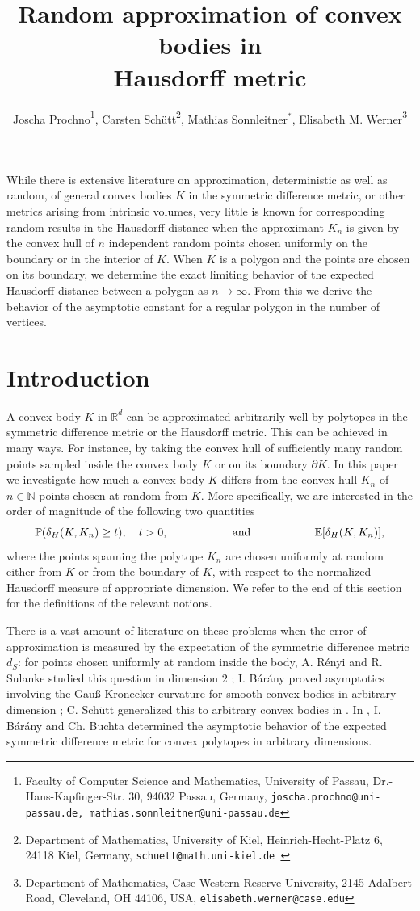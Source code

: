 \documentclass[a4paper,12pt]{article}
\title{Random approximation of convex bodies in\\ Hausdorff metric}
\author{Joscha Prochno\footnote{Faculty of Computer Science and Mathematics, University of Passau, Dr.-Hans-Kapfinger-Str. 30, 94032 Passau, Germany, {\tt joscha.prochno@uni-passau.de, mathias.sonnleitner@uni-passau.de}},
Carsten Sch\"utt\footnote{Department of Mathematics, University of Kiel, Heinrich-Hecht-Platz 6, 24118 Kiel, Germany, 
{\tt schuett@math.uni-kiel.de }},
Mathias Sonnleitner$^{*}$,
Elisabeth M. Werner\footnote{Department of Mathematics, Case Western Reserve University, 2145 Adalbert Road, Cleveland, OH 44106, USA,
{\tt elisabeth.werner@case.edu}}
}
\theoremstyle{definition}
\begin{document}
\maketitle

\abstract
While there is extensive literature on approximation, deterministic as well as random,  of general convex bodies $K$ in the symmetric difference metric, or other metrics arising from intrinsic volumes, very little is known for corresponding random results in the Hausdorff distance when the approximant $K_n$ is given by the convex hull of $n$ independent random points chosen uniformly on the boundary or in the interior of $K$. When $K$ is a polygon and the points are chosen on its boundary, we determine the exact limiting behavior of the expected Hausdorff distance between a polygon as $n\to\infty$. From this we derive the behavior of the asymptotic constant for a regular polygon in the number of vertices.



\section{Introduction}

A convex body $K$ in $\mathbb R^{d}$ can be approximated arbitrarily well by polytopes in  the symmetric difference metric or the Hausdorff metric. This can be achieved in many ways. For instance,
 by taking  the convex hull of sufficiently many random points sampled inside the convex body $K$ or on its boundary $\partial K$. In this paper we investigate  how much a convex body $K$ differs from the convex hull $K_{n}$ of $n\in\mathbb N$ points chosen at random from $K$. More specifically, we are interested in the order of magnitude of the following two quantities
$$
\mathbb P(\delta_{H}(K,K_{n})\geq t), \quad t>0,
\hskip 20mm\mbox{and}\hskip 20mm
\mathbb E[\delta_{H}(K,K_{n})],
$$
where the points spanning the polytope $K_n$ are chosen uniformly at random either from $K$ or from the boundary of $K$, with respect to the normalized Hausdorff measure of appropriate dimension. We refer to the end of this section for the definitions of the relevant notions.

There is a vast  amount  of literature on these problems when  the error of approximation is measured by the expectation of the symmetric difference metric $d_S$: for points chosen uniformly at random  inside the body, A. R\'{e}nyi and  R. Sulanke studied this question in dimension $2$ \cite{RS63,RS64};  
I. B\'ar\'any proved asymptotics  involving  the Gau\ss-Kronecker curvature for smooth convex bodies in arbitrary dimension \cite{Bar92};  C. Sch\"utt  generalized this  to arbitrary convex bodies in \cite{Sch94}. In \cite{BB93}, I. B\'ar\'any and Ch. Buchta determined the asymptotic behavior of the expected symmetric difference metric for convex polytopes in arbitrary dimensions. 
\end{document}
